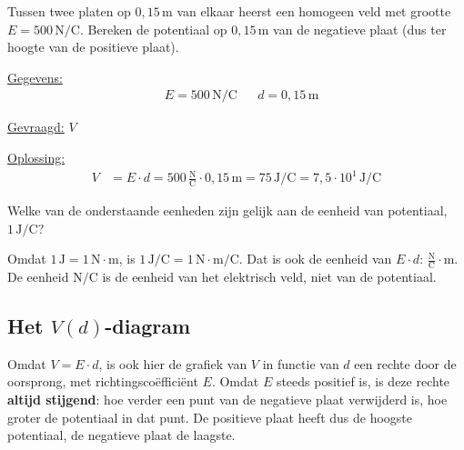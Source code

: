 \documentclass{ximera}
\begin{document}
\begin{example}[foldable=true,title={Voorbeeld: potentiaal berekenen}]\nl
Tussen twee platen op $0{,}15 \, \mathrm{m}$ van elkaar heerst een homogeen veld met grootte $E = 500 \, \mathrm{N/C}$. Bereken de potentiaal op $0{,}15 \, \mathrm{m}$ van de negatieve plaat (dus ter hoogte van de positieve plaat).

\begin{solution}\nl
\underline{Gegevens:}
\begin{align*}
    & E = 500 \, \mathrm{N/C} & & d = 0{,}15 \, \mathrm{m}
\end{align*}

\underline{Gevraagd:} $V$

\underline{Oplossing:}
\begin{align*}
    V &= E \cdot d = 500 \, \frac{\mathrm{N}}{\mathrm{C}} \cdot 0{,}15 \, \mathrm{m} = 75 \, \mathrm{J/C} = \boxed{7{,}5 \cdot 10^{1} \, \mathrm{J/C}}
\end{align*}
\end{solution}
\end{example}

\begin{question}
    Welke van de onderstaande eenheden zijn gelijk aan de eenheid van potentiaal, $1 \, \mathrm{J/C}$?

    \begin{selectAll}
    \end{selectAll}

    \begin{solution}\nl
        Omdat $1 \, \mathrm{J} = 1 \, \mathrm{N \cdot m}$, is $1 \, \mathrm{J/C} = 1 \, \mathrm{N \cdot m/C}$. Dat is ook de eenheid van $E \cdot d$: $\frac{\mathrm{N}}{\mathrm{C}} \cdot \mathrm{m}$. De eenheid $\mathrm{N/C}$ is de eenheid van het elektrisch veld, niet van de potentiaal.
    \end{solution}
\end{question}

\subsection{Het $V(d)$-diagram}
Omdat $V = E \cdot d$, is ook hier de grafiek van $V$ in functie van $d$ een rechte door de oorsprong, met richtingscoëfficiënt $E$. Omdat $E$ steeds positief is, is deze rechte \textbf{altijd stijgend}: hoe verder een punt van de negatieve plaat verwijderd is, hoe groter de potentiaal in dat punt. De positieve plaat heeft dus de hoogste potentiaal, de negatieve plaat de laagste.
\end{document}
